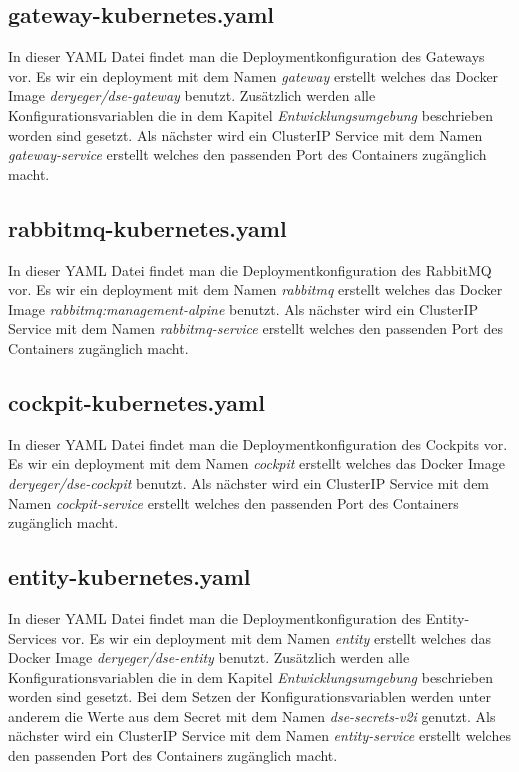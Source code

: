 \subsection{gateway-kubernetes.yaml}

In dieser YAML Datei findet man die Deploymentkonfiguration des Gateways vor. Es wir ein deployment mit dem Namen \textit{gateway} erstellt welches das Docker Image \textit{deryeger/dse-gateway} benutzt. Zusätzlich werden alle Konfigurationsvariablen die in dem Kapitel \textit{Entwicklungsumgebung} beschrieben worden sind gesetzt. 
Als nächster wird ein ClusterIP Service mit dem Namen \textit{gateway-service} erstellt welches den passenden Port des Containers zugänglich macht.

\subsection{rabbitmq-kubernetes.yaml}

In dieser YAML Datei findet man die Deploymentkonfiguration des RabbitMQ vor. Es wir ein deployment mit dem Namen \textit{rabbitmq} erstellt welches das Docker Image \textit{rabbitmq:management-alpine} benutzt. 
Als nächster wird ein ClusterIP Service mit dem Namen \textit{rabbitmq-service} erstellt welches den passenden Port des Containers zugänglich macht.


\subsection{cockpit-kubernetes.yaml}

In dieser YAML Datei findet man die Deploymentkonfiguration des Cockpits vor. Es wir ein deployment mit dem Namen \textit{cockpit} erstellt welches das Docker Image \textit{deryeger/dse-cockpit} benutzt. 
Als nächster wird ein ClusterIP Service mit dem Namen \textit{cockpit-service} erstellt welches den passenden Port des Containers zugänglich macht.

\subsection{entity-kubernetes.yaml}

In dieser YAML Datei findet man die Deploymentkonfiguration des Entity-Services vor. Es wir ein deployment mit dem Namen \textit{entity} erstellt welches das Docker Image \textit{deryeger/dse-entity} benutzt. Zusätzlich werden alle Konfigurationsvariablen die in dem Kapitel \textit{Entwicklungsumgebung} beschrieben worden sind gesetzt. Bei dem Setzen der Konfigurationsvariablen werden unter anderem die Werte aus dem Secret mit dem Namen  \textit{dse-secrets-v2i} genutzt.
Als nächster wird ein ClusterIP Service mit dem Namen \textit{entity-service} erstellt welches den passenden Port des Containers zugänglich macht.

